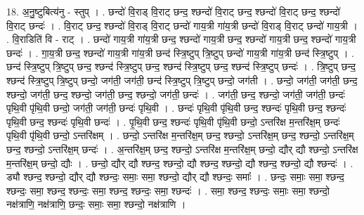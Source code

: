 \documentclass[17pt]{extarticle}
\begin{document}
18. अ॒नु॒ष्टुबित्य॑नु - स्तुप् । . छन्दो॑ वि॒राड् वि॒राट् छन्द॒ श्छन्दो॑ वि॒राट् छन्द॒ श्छन्दो॑ वि॒राट् छन्द॒ श्छन्दो॑ वि॒राट् छन्दः॑ । . वि॒राट् छन्द॒ श्छन्दो॑ वि॒राड् वि॒राट् छन्दो॑ गाय॒त्री गा॑य॒त्री छन्दो॑ वि॒राड् वि॒राट् छन्दो॑ गाय॒त्री । . वि॒राडिति॑ वि - राट् । . छन्दो॑ गाय॒त्री गा॑य॒त्री छन्द॒ श्छन्दो॑ गाय॒त्री छन्द॒ श्छन्दो॑ गाय॒त्री छन्द॒ श्छन्दो॑ गाय॒त्री छन्दः॑ । . गा॒य॒त्री छन्द॒ श्छन्दो॑ गाय॒त्री गा॑य॒त्री छन्द॑ स्त्रि॒ष्टुप् त्रि॒ष्टुप् छन्दो॑ गाय॒त्री गा॑य॒त्री छन्द॑ स्त्रि॒ष्टुप् । . छन्द॑ स्त्रि॒ष्टुप् त्रि॒ष्टुप् छन्द॒ श्छन्द॑ स्त्रि॒ष्टुप् छन्द॒ श्छन्द॑ स्त्रि॒ष्टुप् छन्द॒ श्छन्द॑ स्त्रि॒ष्टुप् छन्दः॑ । . त्रि॒ष्टुप् छन्द॒ श्छन्द॑ स्त्रि॒ष्टुप् त्रि॒ष्टुप् छन्दो॒ जग॑ती॒ जग॑ती॒ छन्द॑ स्त्रि॒ष्टुप् त्रि॒ष्टुप् छन्दो॒ जग॑ती । . छन्दो॒ जग॑ती॒ जग॑ती॒ छन्द॒ श्छन्दो॒ जग॑ती॒ छन्द॒ श्छन्दो॒ जग॑ती॒ छन्द॒ श्छन्दो॒ जग॑ती॒ छन्दः॑ । . जग॑ती॒ छन्द॒ श्छन्दो॒ जग॑ती॒ जग॑ती॒ छन्दः॑ पृथि॒वी पृ॑थि॒वी छन्दो॒ जग॑ती॒ जग॑ती॒ छन्दः॑ पृथि॒वी । . छन्दः॑ पृथि॒वी पृ॑थि॒वी छन्द॒ श्छन्दः॑ पृथि॒वी छन्द॒ श्छन्दः॑ पृथि॒वी छन्द॒ श्छन्दः॑ पृथि॒वी छन्दः॑ । . पृ॒थि॒वी छन्द॒ श्छन्दः॑ पृथि॒वी पृ॑थि॒वी छन्दो॒ ऽन्तरि॑क्ष म॒न्तरि॑क्ष॒म् छन्दः॑ पृथि॒वी पृ॑थि॒वी छन्दो॒ ऽन्तरि॑क्षम् । . छन्दो॒ ऽन्तरि॑क्ष म॒न्तरि॑क्ष॒म् छन्द॒ श्छन्दो॒ ऽन्तरि॑क्ष॒म् छन्द॒ श्छन्दो॒ ऽन्तरि॑क्ष॒म् छन्द॒ श्छन्दो॒ ऽन्तरि॑क्ष॒म् छन्दः॑ । . अ॒न्तरि॑क्ष॒म् छन्द॒ श्छन्दो॒ ऽन्तरि॑क्ष म॒न्तरि॑क्ष॒म् छन्दो॒ द्यौर् द्यौ श्छन्दो॒ ऽन्तरि॑क्ष म॒न्तरि॑क्ष॒म् छन्दो॒ द्यौः । . छन्दो॒ द्यौर् द्यौ श्छन्द॒ श्छन्दो॒ द्यौ श्छन्द॒ श्छन्दो॒ द्यौ श्छन्द॒ श्छन्दो॒ द्यौ श्छन्दः॑ । . ड्यौ श्छन्द॒ श्छन्दो॒ द्यौर् द्यौ श्छन्दः॒ समाः॒ समा॒ श्छन्दो॒ द्यौर् द्यौ श्छन्दः॒ समाः᳚ । . छन्दः॒ समाः॒ समा॒ श्छन्द॒ श्छन्दः॒ समा॒ श्छन्द॒ श्छन्दः॒ समा॒ श्छन्द॒ श्छन्दः॒ समा॒ श्छन्दः॑ । . समा॒ श्छन्द॒ श्छन्दः॒ समाः॒ समा॒ श्छन्दो॒ नक्ष॑त्राणि॒ नक्ष॑त्राणि॒ छन्दः॒ समाः॒ समा॒ श्छन्दो॒ नक्ष॑त्राणि । \newline
\end{document}
